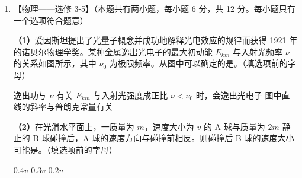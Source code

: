 \documentclass[\gkver]{gaokaozhenti}
\begin{document}
\begin{enumerate}
{（2）由热力学第一定律 $Q+W=\Delta U$，可知 $\Delta U=1.5\times10^{4}\UJ$，内能增加，温度升高；理想气体对外界做功，体积增大，密度减小。D 正确。
}

\item
【物理——选修 3-5】（本题共有两小题，每小题 6 分，共 12 分。每小题只有一个选项符合题意）

\textbf{（1）}爱因斯坦提出了光量子概念并成功地解释光电效应的规律而获得 1921 年的诺贝尔物理学奖。某种金属逸出光电子的最大初动能 $E_{km}$ 与入射光频率 $\nu$ 的关系如图所示，其中 $\nu_{0}$ 为极限频率。从图中可以确定的是。（填选项前的字母）


\fourchoices
{逸出功与 $\nu$ 有关}
{$E_{km}$ 与入射光强度成正比}
{$\nu<\nu_{0}$ 时，会逸出光电子}
{图中直线的斜率与普朗克常量有关}

\textbf{（2）}在光滑水平面上，一质量为 $m$，速度大小为 $v$ 的 A 球与质量为 $2m$ 静止的 B 球碰撞后，A 球的速度方向与碰撞前相反。则碰撞后 B 球的速度大小可能是。（填选项前的字母）

{$0.4v$}
{$0.3v$}
{$0.2v$}

\end{enumerate}
\end{document}
